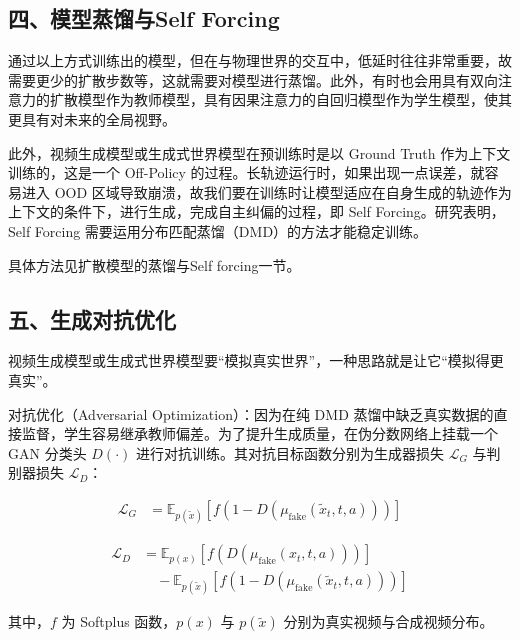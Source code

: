 \hypertarget{ux56dbux6a21ux578bux84b8ux998fux4e0eself-forcing}{%
\subsection{四、模型蒸馏与Self Forcing}\label{ux56dbux6a21ux578bux84b8ux998fux4e0eself-forcing}}

通过以上方式训练出的模型，但在与物理世界的交互中，低延时往往非常重要，故需要更少的扩散步数等，这就需要对模型进行蒸馏。此外，有时也会用具有双向注意力的扩散模型作为教师模型，具有因果注意力的自回归模型作为学生模型，使其更具有对未来的全局视野。

此外，视频生成模型或生成式世界模型在预训练时是以 Ground Truth 作为上下文训练的，这是一个 Off-Policy 的过程。长轨迹运行时，如果出现一点误差，就容易进入 OOD 区域导致崩溃，故我们要在训练时让模型适应在自身生成的轨迹作为上下文的条件下，进行生成，完成自主纠偏的过程，即 Self Forcing。研究表明，Self Forcing 需要运用分布匹配蒸馏（DMD）的方法才能稳定训练。

具体方法见扩散模型的蒸馏与Self forcing一节。

\hypertarget{ux4e94ux751fux6210ux5bf9ux6297ux4f18ux5316}{%
\subsection{五、生成对抗优化}\label{ux4e94ux751fux6210ux5bf9ux6297ux4f18ux5316}}

视频生成模型或生成式世界模型要``模拟真实世界''，一种思路就是让它``模拟得更真实''。

对抗优化（Adversarial Optimization）：因为在纯 DMD 蒸馏中缺乏真实数据的直接监督，学生容易继承教师偏差。为了提升生成质量，在伪分数网络上挂载一个 GAN 分类头 \(D(\cdot)\) 进行对抗训练。其对抗目标函数分别为生成器损失 \(\mathcal{L}_G\) 与判别器损失 \(\mathcal{L}_D\)：

\[
\begin{aligned}
\mathcal{L}_G
&=
\mathbb{E}_{p(\tilde{x})}
\left[
f\left(1-D(\mu_{\mathrm{fake}}(\tilde{x}_t,t,a))\right)
\right]
\end{aligned}
\]

\[
\begin{aligned}
\mathcal{L}_D
&=
\mathbb{E}_{p(x)}
\left[
f\left(D(\mu_{\mathrm{fake}}(x_t,t,a))\right)
\right]
\\
&\quad -
\mathbb{E}_{p(\tilde{x})}
\left[
f\left(1-D(\mu_{\mathrm{fake}}(\tilde{x}_t,t,a))\right)
\right]
\end{aligned}
\]

其中，\(f\) 为 Softplus 函数，\(p(x)\) 与 \(p(\tilde{x})\) 分别为真实视频与合成视频分布。

